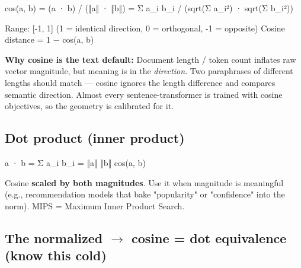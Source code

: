 \documentclass[11pt]{article}
\newenvironment{Shaded}{\begin{snugshade}}{\end{snugshade}}
\newcommand{\DecValTok}[1]{\textcolor[rgb]{0.96,0.45,0.00}{#1}}
\newcommand{\NormalTok}[1]{\textcolor[rgb]{0.81,0.81,0.76}{#1}}
\newcommand{\OperatorTok}[1]{\textcolor[rgb]{0.81,0.81,0.76}{#1}}
\begin{document}

\begin{Shaded}
\begin{Highlighting}[]
\NormalTok{cos(a, b) }\OperatorTok{=}\NormalTok{ (a · b) }\OperatorTok{/}\NormalTok{ (‖a‖ · ‖b‖)}
          \OperatorTok{=}\NormalTok{ Σ a\_i b\_i  }\OperatorTok{/}\NormalTok{  (sqrt(Σ a\_i²) · sqrt(Σ b\_i²))}

\NormalTok{Range: [}\OperatorTok{{-}}\DecValTok{1}\NormalTok{, }\DecValTok{1}\NormalTok{]   (}\DecValTok{1} \OperatorTok{=}\NormalTok{ identical direction, }\DecValTok{0} \OperatorTok{=}\NormalTok{ orthogonal, }\OperatorTok{{-}}\DecValTok{1} \OperatorTok{=}\NormalTok{ opposite)}
\NormalTok{Cosine distance }\OperatorTok{=} \DecValTok{1}\NormalTok{ − cos(a, b)}
\end{Highlighting}
\end{Shaded}

\textbf{Why cosine is the text default:} Document length / token count inflates raw vector magnitude, but meaning is in the \emph{direction}. Two paraphrases of different lengths should match --- cosine ignores the length difference and compares semantic direction. Almost every sentence-transformer is trained with cosine objectives, so the geometry is calibrated for it.

\subsection{Dot product (inner product)}\label{dot-product-inner-product}


\begin{Shaded}
\begin{Highlighting}[]
\NormalTok{a · b }\OperatorTok{=}\NormalTok{ Σ a\_i b\_i }\OperatorTok{=}\NormalTok{ ‖a‖ ‖b‖ cos(a, b)}
\end{Highlighting}
\end{Shaded}

Cosine \textbf{scaled by both magnitudes}. Use it when magnitude is meaningful (e.g., recommendation models that bake "popularity" or "confidence" into the norm). MIPS = Maximum Inner Product Search.

\subsection{\texorpdfstring{The normalized \(\rightarrow\) cosine = dot equivalence (know this cold)}{The normalized \textbackslash rightarrow cosine = dot equivalence (know this cold)}}\label{the-normalized-rightarrow-cosine--dot-equivalence-know-this-cold}
\end{document}
